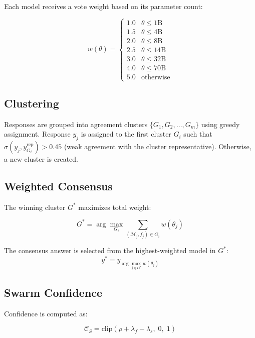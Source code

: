 \documentclass[11pt, a4paper, twocolumn]{article}
\newcommand{\conf}{\mathcal{C}}
\newcommand{\model}{\mathcal{M}}
\begin{document}
Each model receives a vote weight based on its parameter count:

\begin{equation}
    w(\theta) = 
    \begin{cases}
        1.0 & \theta \leq 1\text{B} \\
        1.5 & \theta \leq 4\text{B} \\
        2.0 & \theta \leq 8\text{B} \\
        2.5 & \theta \leq 14\text{B} \\
        3.0 & \theta \leq 32\text{B} \\
        4.0 & \theta \leq 70\text{B} \\
        5.0 & \text{otherwise}
    \end{cases}
\end{equation}

\subsection{Clustering}

Responses are grouped into agreement clusters $\{G_1, G_2, \ldots, G_m\}$ using greedy assignment. Response $y_j$ is assigned to the first cluster $G_i$ such that $\sigma(y_j, y_{G_i}^{\text{rep}}) > 0.45$ (weak agreement with the cluster representative). Otherwise, a new cluster is created.

\subsection{Weighted Consensus}

The winning cluster $G^*$ maximizes total weight:

\begin{equation}
    G^* = \arg\max_{G_i} \sum_{(\model_j, f_j) \in G_i} w(\theta_j)
\end{equation}

The consensus answer is selected from the highest-weighted model in $G^*$:
\begin{equation}
    y^* = y_{\arg\max_{j \in G^*} w(\theta_j)}
\end{equation}

\subsection{Swarm Confidence}

Confidence is computed as:

\begin{equation}
    \conf_S = \text{clip}\!\left(\rho + \lambda_f - \lambda_s,\; 0,\; 1\right)
\end{equation}
\end{document}
